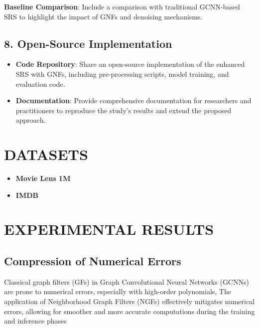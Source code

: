 \documentclass[journal]{IEEEtran}
\begin{document}
\textbf{Baseline Comparison}: Include a comparison with traditional GCNN-based SRS to highlight the impact of GNFs and denoising mechanisms.

\subsection*{8. Open-Source Implementation}

\begin{itemize}
  \item \textbf{Code Repository}: Share an open-source implementation of the enhanced SRS with GNFs, including pre-processing scripts, model training, and evaluation code.
  \item \textbf{Documentation}: Provide comprehensive documentation for researchers and practitioners to reproduce the study's results and extend the proposed approach.
\end{itemize}



\section{DATASETS}

\begin{itemize}
  \item \textbf{Movie Lens 1M}
  \item \textbf{IMDB}
\end{itemize}



\section{EXPERIMENTAL RESULTS}

\subsection*{Compression of Numerical Errors}

Classical graph filters (GFs) in Graph Convolutional Neural Networks (GCNNs) are prone to numerical errors, especially with high-order polynomials,
The application of Neighborhood Graph Filters (NGFs) effectively mitigates numerical errors, allowing for smoother and more accurate computations during the training and inference phases
\end{document}
